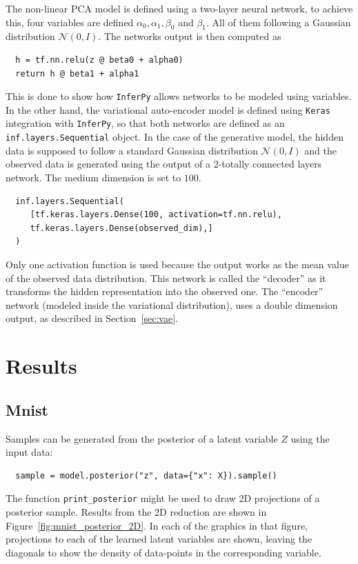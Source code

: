 The non-linear PCA model is defined using a two-layer neural network, to achieve this, four variables are defined \(\alpha_{0}, \alpha_{1}, \beta_{0}\) and \(\beta_{1}\). All of them following a Gaussian distribution \(\mathcal{N}(0, I)\). The networks output is then computed as

\begin{verbatim}
  h = tf.nn.relu(z @ beta0 + alpha0)
  return h @ beta1 + alpha1
\end{verbatim}

This is done to show how \texttt{InferPy} allows networks to be modeled using variables. In the other hand, the variational auto-encoder model is defined using \texttt{Keras} integration with \texttt{InferPy}, so that both networks are defined as an \texttt{inf.layers.Sequential} object. In the case of the generative model, the hidden data is supposed to follow a standard Gaussian distribution \(\mathcal{N}(0,I)\) and the observed data is generated using the output of a 2-totally connected layers network. The medium dimension is set to \(100\).

\begin{verbatim}
  inf.layers.Sequential(
     [tf.keras.layers.Dense(100, activation=tf.nn.relu),
     tf.keras.layers.Dense(observed_dim),]
  )
\end{verbatim}

Only one activation function is used because the output works as the mean value of the observed data distribution. This network is called the ``decoder'' as it transforms the hidden representation into the observed one. The ``encoder'' network (modeled inside the variational distribution), uses a double dimension output, as described in Section~\ref{sec:vae}.

\section{Results}

\subsection{Mnist}

Samples can be generated from the posterior of a latent variable \(Z\) using the input data:
\begin{verbatim}
  sample = model.posterior("z", data={"x": X}).sample()
\end{verbatim}

The function \texttt{print\_posterior} might be used to draw 2D projections of a posterior sample. Results from the 2D reduction are shown in Figure~\ref{fig:mnist_posterior_2D}. In each of the graphics in that figure, projections to each of the learned latent variables are shown, leaving the diagonals to show the density of data-points in the corresponding variable.


